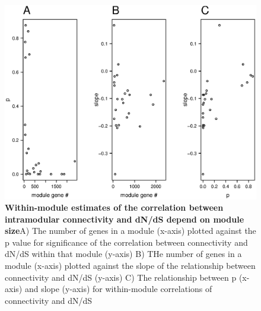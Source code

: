 \begin{figure}[ht!]
      \centering
       \includegraphics[width=\linewidth]{Ch4FigMod}
    \caption{\textbf{ Within-module estimates of the correlation between intramodular connectivity and dN/dS depend on module size}A) The number of genes in a module (x-axis) plotted against the p value for significance of the correlation between connectivity and dN/dS within that module (y-axis) B) THe number of genes in a module (x-axis) plotted against the slope of the relationship between connectivity and dN/dS (y-axis) C) The relationship between p (x-axis) and slope (y-axis) for within-module correlations of connectivity and dN/dS }
    \label{fig:fsMod}
\end{figure}




